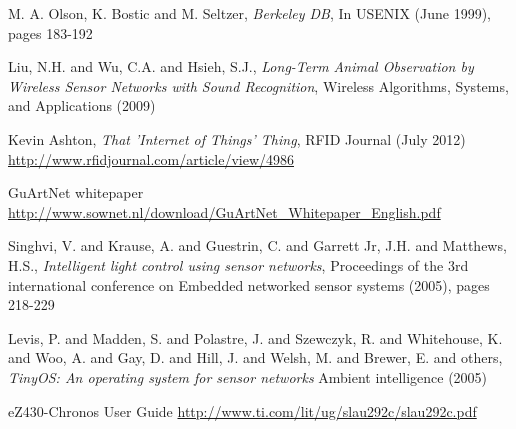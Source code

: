 \begin{thebibliography}{99}

M. A. Olson, K. Bostic and M. Seltzer,
\textit{Berkeley DB},
In USENIX (June 1999), pages 183-192

Liu, N.H. and Wu, C.A. and Hsieh, S.J.,
\textit{Long-Term Animal Observation by Wireless Sensor Networks with Sound Recognition},
Wireless Algorithms, Systems, and Applications (2009)

Kevin Ashton,
\textit{That 'Internet of Things' Thing},
RFID Journal (July 2012) \url{http://www.rfidjournal.com/article/view/4986}

GuArtNet whitepaper \url{http://www.sownet.nl/download/GuArtNet\_Whitepaper\_English.pdf}

Singhvi, V. and Krause, A. and Guestrin, C. and Garrett Jr, J.H. and Matthews, H.S.,
\textit{Intelligent light control using sensor networks},
Proceedings of the 3rd international conference on Embedded networked sensor systems (2005), pages 218-229

Levis, P. and Madden, S. and Polastre, J. and Szewczyk, R. and Whitehouse, K. and Woo, A. and Gay, D. and Hill, J. and Welsh, M. and Brewer, E. and others,
\textit{TinyOS: An operating system for sensor networks}
Ambient intelligence (2005)

eZ430-Chronos User Guide \url{http://www.ti.com/lit/ug/slau292c/slau292c.pdf}


\end{thebibliography}
